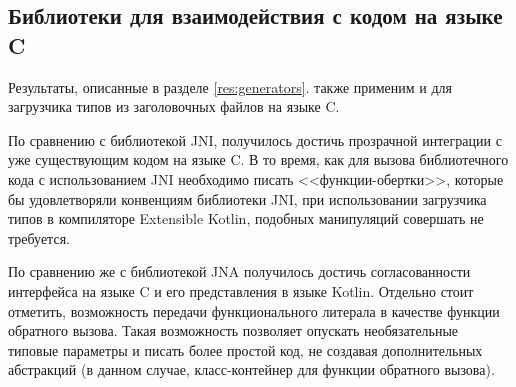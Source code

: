 \subsection{Библиотеки для взаимодействия с кодом на языке C}
Результаты, описанные в разделе \ref{res:generators}. также применим и для загрузчика типов из заголовочных файлов на языке C.

По сравнению с библиотекой JNI, получилось достичь прозрачной интеграции с уже существующим кодом на языке C.
В то время, как для вызова библиотечного кода с использованием JNI необходимо писать <<функции-обертки>>, которые бы удовлетворяли конвенциям библиотеки JNI, при использовании загрузчика типов в компиляторе Extensible Kotlin, подобных манипуляций совершать не требуется.

По сравнению же с библиотекой JNA получилось достичь согласованности интерфейса на языке C и его представления в языке Kotlin. Отдельно стоит отметить, возможность передачи функционального литерала в качестве функции обратного вызова.
Такая возможность позволяет опускать необязательные типовые параметры и писать более простой код, не создавая дополнительных абстракций (в данном случае, класс-контейнер для функции обратного вызова).

